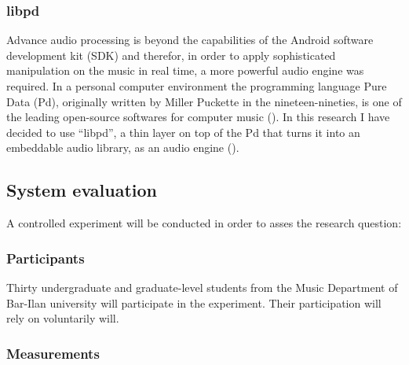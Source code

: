 \subsubsection{libpd}\label{methods:libpd}

Advance audio processing is beyond the capabilities of the Android software development kit (SDK) and therefor, in order to apply sophisticated manipulation on the music in real time, a more powerful audio engine was required. In a personal computer environment the programming language Pure Data (Pd), originally written by Miller Puckette in the nineteen-nineties, is one of the leading open-source softwares for computer music (\cite{web:pd}). In this research I have decided to use ``libpd'', a thin layer on top of the Pd that turns it into an embeddable audio library, as an audio engine (\cite[page v]{brinkmann12}).

\subsection{System evaluation}

A controlled experiment will be conducted in order to asses the research question: \emph{\reserchquestion}

\subsubsection{Participants}

Thirty undergraduate and graduate-level students from the Music Department of Bar-Ilan university will participate in the experiment. Their participation will rely on voluntarily will.

\subsubsection{Measurements}

